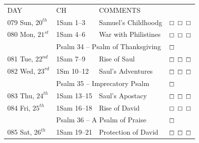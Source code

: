 \documentclass[10pt,landscape,twocolumn,letterpaper]{article}
\begin{document}
\begin{tabular}{p{0.75in}p{0.8in}p{1.7in}p{0.50in}}
  DAY & CH & COMMENTS &  \\
\tiny 079 \normalsize  \textcolor[rgb]{0.00,0.00,1.00}{Sun, $20^{th}$} & \textcolor[rgb]{0.00,0.00,1.00}{1Sam 1--3} & \textcolor[rgb]{0.50,0.50,0.50}{\small Samuel's Childhoodg} & $\boxempty$ $\boxempty$ $\boxempty$\\

\tiny 080 \normalsize  \textcolor[rgb]{0.00,0.00,1.00}{Mon, $21^{st}$} & \textcolor[rgb]{0.00,0.00,1.00}{1Sam 4--6} & \textcolor[rgb]{0.50,0.50,0.50}{\small War with Philistines} & $\boxempty$ $\boxempty$ $\boxempty$\\
     & \multicolumn{2}{l}{\textcolor[rgb]{1.00,0.00,0.00}{Psalm 34 -- Psalm of Thanksgiving}} & $\boxempty$ \\
     
\tiny 081 \normalsize  \textcolor[rgb]{0.00,0.00,1.00}{Tue, $22^{nd}$} & \textcolor[rgb]{0.00,0.00,1.00}{1Sam 7--9} & \textcolor[rgb]{0.50,0.50,0.50}{\small Rise of Saul} &  $\boxempty$ $\boxempty$ $\boxempty$\\

\tiny 082 \normalsize \textcolor[rgb]{0.00,0.00,1.00}{Wed, $23^{rd}$} & \textcolor[rgb]{0.00,0.00,1.00}{1Sm 10--12} & \textcolor[rgb]{0.50,0.50,0.50}{\small Saul's Adventures} & $\boxempty$ $\boxempty$ $\boxempty$\\
     & \multicolumn{2}{l}{\textcolor[rgb]{1.00,0.00,0.00}{Psalm 35 -- Imprecatory Psalm}} & $\boxempty$ \\

\tiny 083 \normalsize \textcolor[rgb]{0.00,0.00,1.00}{Thu, $24^{th}$} & \textcolor[rgb]{0.00,0.00,1.00}{1Sam 13--15} & \textcolor[rgb]{0.50,0.50,0.50}{\small Saul's Apostacy} & $\boxempty$ $\boxempty$ $\boxempty$\\

\tiny 084 \normalsize \textcolor[rgb]{0.00,0.00,1.00}{Fri, $25^{th}$} & \textcolor[rgb]{0.00,0.00,1.00}{1Sam 16--18} & \textcolor[rgb]{0.50,0.50,0.50}{\small Rise of David} &  $\boxempty$ $\boxempty$ $\boxempty$\\
     & \multicolumn{2}{l}{\textcolor[rgb]{1.00,0.00,0.00}{Psalm 36 -- A Psalm of Praise}} & $\boxempty$ \\

\tiny 085 \normalsize \textcolor[rgb]{0.00,0.00,1.00}{Sat, $26^{th}$} & \textcolor[rgb]{0.00,0.00,1.00}{1Sam 19--21} & \textcolor[rgb]{0.50,0.50,0.50}{\small Protection of David} & $\boxempty$ $\boxempty$ $\boxempty$\\


\end{tabular}
\end{document}
